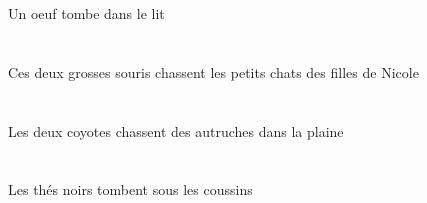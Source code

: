 \begin{exe}
 Un oeuf tombe dans le lit
\ex\glll
   \DEMDuErg{}   \grosBDu{}   \sourisBDuErg{}   \DEFPlAbs{}    \DEFPlObl{}    \INDSgObl{}   \NicoleBSgObl{}   \DE{}   \filleCPlObl{}   \DE{}   \petitDPl{}   \chatDPlAbs{}  \chasserVtPrsDPl{} \\
   \DEMDuErgP{}   \grosBDuP{}   \sourisBDuErgP{}   \DEFPlAbsP{}    \DEFPlOblP{}    \INDSgOblP{}   \NicoleBSgOblP{}   \DEP{}   \filleCPlOblP{}   \DEP{}   \petitDPlP{}   \chatDPlAbsP{}  \chasserVtPrsDPlP{} \\
   \DEMDuErgG{}   \grosBDuG{}   \sourisBDuErgG{}   \DEFPlAbsG{}    \DEFPlOblG{}    \INDSgOblG{}   \NicoleBSgOblG{}   \DEG{}   \filleCPlOblG{}   \DEG{}   \petitDPlG{}   \chatDPlAbsG{}  \chasserVtPrsDPlG{} \\
 Ces deux grosses souris chassent les petits chats des filles de Nicole
\ex\glll
    \DEFSgObl{}   \plaineASgObl{}   \DANS{}   \DEFDuErg{}   \coyoteCDuErg{}   \INDPlAbs{}   \autrucheBPlAbs{}  \chasserVtPrsBPl{} \\
    \DEFSgOblP{}   \plaineASgOblP{}   \DANSP{}   \DEFDuErgP{}   \coyoteCDuErgP{}   \INDPlAbsP{}   \autrucheBPlAbsP{}  \chasserVtPrsBPlP{} \\
    \DEFSgOblG{}   \plaineASgOblG{}   \DANSG{}   \DEFDuErgG{}   \coyoteCDuErgG{}   \INDPlAbsG{}   \autrucheBPlAbsG{}  \chasserVtPrsBPlG{} \\
 Les deux coyotes chassent des autruches dans la plaine
\ex\glll
   \DEFPlAbs{}   \noirBPl{}   \theBPlAbs{}    \DEFPlObl{}   \coussinBPlObl{}   \SOUS{}  \tomberViPrsBPl{} \\
   \DEFPlAbsP{}   \noirBPlP{}   \theBPlAbsP{}    \DEFPlOblP{}   \coussinBPlOblP{}   \SOUSP{}  \tomberViPrsBPlP{} \\
   \DEFPlAbsG{}   \noirBPlG{}   \theBPlAbsG{}    \DEFPlOblG{}   \coussinBPlOblG{}   \SOUSG{}  \tomberViPrsBPlG{} \\
 Les thés noirs tombent sous les coussins
\ex\glll
   \DEFDuErg{}   \jauneDDu{}   \chatDDuErg{}    \DEFSgObl{}   \petitDSg{}   \cuisineDSgObl{}   \DANS{}   \DEFPlAbs{}    \DEFSgObl{}   \maisonDSgObl{}   \DE{}   \sourisBPlAbs{}  \chasserVtPrsBPl{} \\
   \DEFDuErgP{}   \jauneDDuP{}   \chatDDuErgP{}    \DEFSgOblP{}   \petitDSgP{}   \cuisineDSgOblP{}   \DANSP{}   \DEFPlAbsP{}    \DEFSgOblP{}   \maisonDSgOblP{}   \DEP{}   \sourisBPlAbsP{}  \chasserVtPrsBPlP{} \\
   \DEFDuErgG{}   \jauneDDuG{}   \chatDDuErgG{}    \DEFSgOblG{}   \petitDSgG{}   \cuisineDSgOblG{}   \DANSG{}   \DEFPlAbsG{}    \DEFSgOblG{}   \maisonDSgOblG{}   \DEG{}   \sourisBPlAbsG{}  \chasserVtPrsBPlG{} \\

\end{exe}
